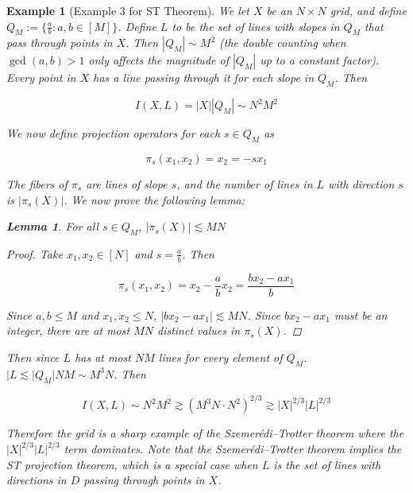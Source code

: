 \documentclass[12pt]{amsart}
\newtheorem{lemma}[theorem]{Lemma}
\newtheorem{example}[theorem]{Example}
\begin{document}
\begin{example}[Example 3 for ST Theorem]
    


We let $X$ be an $N\times N$ grid, and define $Q_M := \{\frac{a}{b} : a,b \in  [M]\}$. Define $L$ to be the set of lines with slopes in $Q_M$ that pass through points in $X$. Then $|Q_M| \sim M^2$ (the double counting when $\gcd(a,b) > 1$ only affects the magnitude of $|Q_M|$ up to a constant factor). Every point in $X$ has a line passing through it for each slope in $Q_M$. Then 


\begin{equation}
I(X,L) =|X| |Q_M| \sim N^2 M^2
\end{equation}

We now define projection operators for each $s\in Q_M$ as 

\begin{equation}
\pi_s(x_1, x_2) = x_2 = -sx_1
\end{equation} 

The fibers of $\pi_s$ are lines of slope $s$, and the number of lines in $L$ with direction $s$ is $|\pi_s(X)|$. We now prove the following lemma: 

\begin{lemma}
    For all $s\in Q_M$, $|\pi_s(X)| \lesssim MN$
\end{lemma}

\begin{proof}
Take $x_1, x_2 \in [N]$ and $s = \frac{a}{b} $. Then 

\begin{equation}
\pi_s(x_1, x_2) = x_2 - \frac{a}{b} x_2 = \frac{bx_2 - ax_1}{b} 
\end{equation}

Since $a,b \leq M$ and $x_1, x_2 \leq N$, $|bx_2 - ax_1| \lesssim MN$. Since $bx_2 - ax_1$ must be an integer, there are at most $MN$ distinct values in $\pi_s(X)$. 
\end{proof}

Then since $L$ has at most $NM$ lines for every element of $Q_M$. $|L \lesssim |Q_M|NM \sim M^3 N$. Then 

\begin{equation}
I(X,L) \sim N^2 M^2 \gtrsim (M^3 N \cdot N^2)^{2/3} \gtrsim |X|^{2/3} |L|^{2/3}
\end{equation}

Therefore the grid is a sharp example of the Szemerédi–Trotter theorem where the $|X|^{2/3}|L|^{2/3}$ term dominates. Note that the Szemerédi–Trotter theorem implies the ST projection theorem, which is a special case when $L$ is the set of lines with directions in $D$ passing through points in $X$. 


\end{example}
\end{document}

